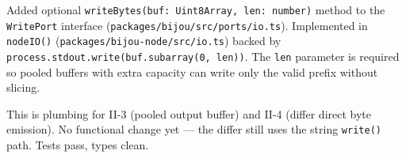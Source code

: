 Added optional \texttt{w\allowbreak{}r\allowbreak{}i\allowbreak{}t\allowbreak{}e\allowbreak{}B\allowbreak{}y\allowbreak{}t\allowbreak{}e\allowbreak{}s\allowbreak{}(\allowbreak{}b\allowbreak{}u\allowbreak{}f\allowbreak{}:\allowbreak{} \allowbreak{}U\allowbreak{}i\allowbreak{}n\allowbreak{}t\allowbreak{}8\allowbreak{}A\allowbreak{}r\allowbreak{}r\allowbreak{}a\allowbreak{}y\allowbreak{},\allowbreak{} \allowbreak{}l\allowbreak{}e\allowbreak{}n\allowbreak{}:\allowbreak{} \allowbreak{}n\allowbreak{}u\allowbreak{}m\allowbreak{}b\allowbreak{}e\allowbreak{}r\allowbreak{})} method to the \texttt{W\allowbreak{}r\allowbreak{}i\allowbreak{}t\allowbreak{}e\allowbreak{}P\allowbreak{}o\allowbreak{}r\allowbreak{}t} interface (\texttt{p\allowbreak{}a\allowbreak{}c\allowbreak{}k\allowbreak{}a\allowbreak{}g\allowbreak{}e\allowbreak{}s\allowbreak{}/\allowbreak{}b\allowbreak{}i\allowbreak{}j\allowbreak{}o\allowbreak{}u\allowbreak{}/\allowbreak{}s\allowbreak{}r\allowbreak{}c\allowbreak{}/\allowbreak{}p\allowbreak{}o\allowbreak{}r\allowbreak{}t\allowbreak{}s\allowbreak{}/\allowbreak{}i\allowbreak{}o\allowbreak{}.\allowbreak{}t\allowbreak{}s}). Implemented in \texttt{n\allowbreak{}o\allowbreak{}d\allowbreak{}e\allowbreak{}I\allowbreak{}O\allowbreak{}(\allowbreak{})} (\texttt{p\allowbreak{}a\allowbreak{}c\allowbreak{}k\allowbreak{}a\allowbreak{}g\allowbreak{}e\allowbreak{}s\allowbreak{}/\allowbreak{}b\allowbreak{}i\allowbreak{}j\allowbreak{}o\allowbreak{}u\allowbreak{}-\allowbreak{}n\allowbreak{}o\allowbreak{}d\allowbreak{}e\allowbreak{}/\allowbreak{}s\allowbreak{}r\allowbreak{}c\allowbreak{}/\allowbreak{}i\allowbreak{}o\allowbreak{}.\allowbreak{}t\allowbreak{}s}) backed by \texttt{p\allowbreak{}r\allowbreak{}o\allowbreak{}c\allowbreak{}e\allowbreak{}s\allowbreak{}s\allowbreak{}.\allowbreak{}s\allowbreak{}t\allowbreak{}d\allowbreak{}o\allowbreak{}u\allowbreak{}t\allowbreak{}.\allowbreak{}w\allowbreak{}r\allowbreak{}i\allowbreak{}t\allowbreak{}e\allowbreak{}(\allowbreak{}b\allowbreak{}u\allowbreak{}f\allowbreak{}.\allowbreak{}s\allowbreak{}u\allowbreak{}b\allowbreak{}a\allowbreak{}r\allowbreak{}r\allowbreak{}a\allowbreak{}y\allowbreak{}(\allowbreak{}0\allowbreak{},\allowbreak{} \allowbreak{}l\allowbreak{}e\allowbreak{}n\allowbreak{})\allowbreak{})}. The \texttt{l\allowbreak{}e\allowbreak{}n} parameter is required so pooled buffers with extra capacity can write only the valid prefix without slicing.

This is plumbing for II-3 (pooled output buffer) and II-4 (differ direct byte emission). No functional change yet --- the differ still uses the string \texttt{w\allowbreak{}r\allowbreak{}i\allowbreak{}t\allowbreak{}e\allowbreak{}(\allowbreak{})} path. Tests pass, types clean.

